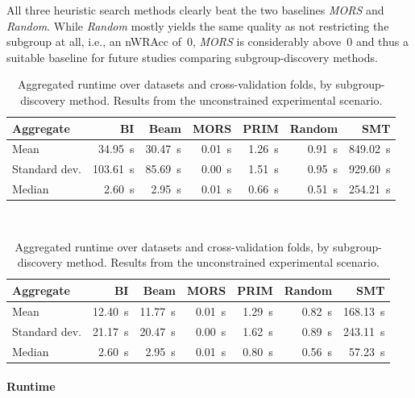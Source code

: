 \documentclass{article}
\theoremstyle{definition}
\begin{document}
All three heuristic search methods clearly beat the two baselines \emph{MORS} and \emph{Random}.
While \emph{Random} mostly yields the same quality as not restricting the subgroup at all, i.e., an nWRAcc of~0, \emph{MORS} is considerably above~0 and thus a suitable baseline for future studies comparing subgroup-discovery methods.

\begin{table}[t]
	\centering
	\begin{subtable}{\textwidth}
		\centering
		\begin{tabular}{lrrrrrr}
			\toprule
			Aggregate & BI & Beam & MORS & PRIM & Random & SMT \\
			\midrule
			Mean & 34.95~s & 30.47~s & 0.01~s & 1.26~s & 0.91~s & 849.02~s \\
			Standard dev. & 103.61~s & 85.69~s & 0.00~s & 1.51~s & 0.95~s & 929.60~s \\
			Median & 2.60~s & 2.95~s & 0.01~s & 0.66~s & 0.51~s & 254.21~s \\
			\bottomrule
		\end{tabular}
		\caption{
			All 27 datasets.
		}
		\label{tab:csd:unconstrained-runtime-all-datasets}
	\end{subtable}
	\\ \vspace{\baselineskip}
	\begin{subtable}{\textwidth}
		\centering
		\begin{tabular}{lrrrrrr}
			\toprule
			Aggregate & BI & Beam & MORS & PRIM & Random & SMT \\
			\midrule
			Mean & 12.40~s & 11.77~s & 0.01~s & 1.29~s & 0.82~s & 168.13~s \\
			Standard dev. & 21.17~s & 20.47~s & 0.00~s & 1.62~s & 0.89~s & 243.11~s \\
			Median & 2.60~s & 2.95~s & 0.01~s & 0.80~s & 0.56~s & 57.23~s \\
			\bottomrule
		\end{tabular}
		\caption{
			17 datasets without \emph{SMT} timeouts.
		}
		\label{tab:csd:unconstrained-runtime-no-timeout-datasets}
	\end{subtable}
	\caption{
		Aggregated runtime over datasets and cross-validation folds, by subgroup-discovery method.
		Results from the unconstrained experimental scenario.
	}
	\label{tab:csd:unconstrained-runtime}
\end{table}

\paragraph{Runtime}
\end{document}
